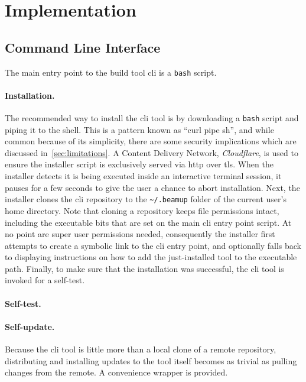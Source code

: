 \section{Implementation}

\subsection{Command Line Interface}
The main entry point to the build tool \acrshort{cli} is a \lstinline|bash| script.

\paragraph{Installation.} The recommended way to install the \acrshort{cli} tool is by downloading a \lstinline|bash| script and piping it to the shell. This is a pattern known as ``curl pipe sh'', and while common because of its simplicity, there are some security implications which are discussed in~\ref{sec:limitations}. A Content Delivery Network, \emph{Cloudflare}, is used to ensure the installer script is exclusively served via \acrshort{http} over \acrshort{tls}. When the installer detects it is being executed inside an interactive terminal session, it pauses for a few seconds to give the user a chance to abort installation. Next, the installer clones the \acrshort{cli} repository to the \lstinline|~/.beamup| folder of the current user's home directory. Note that cloning a repository keeps file permissions intact, including the executable bits that are set on the main \acrshort{cli} entry point script. At no point are super user permissions needed, consequently the installer first attempts to create a symbolic link to the \acrshort{cli} entry point, and optionally falls back to displaying instructions on how to add the just-installed tool to the executable path. Finally, to make sure that the installation was successful, the \acrshort{cli} tool is invoked for a self-test.

\paragraph{Self-test.}


\paragraph{Self-update.} Because the \acrshort{cli} tool is little more than a local clone of a remote repository, distributing and installing updates to the tool itself becomes as trivial as pulling changes from the remote. A convenience wrapper is provided.



